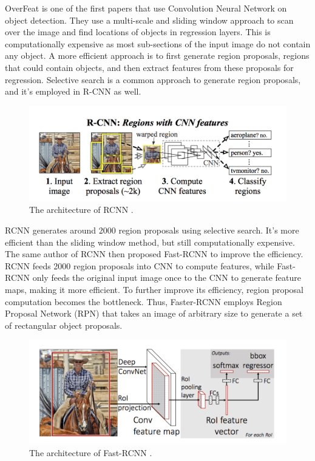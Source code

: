 OverFeat \cite{overfeat2014} is one of the first papers that use Convolution Neural Network on object detection. They use a multi-scale and sliding window approach to scan over the image and find locations of objects in regression layers. This is computationally expensive as most sub-sections of the input image do not contain any object. A more efficient approach is to first generate region proposals, regions that could contain objects, and then extract features from these proposals for regression. Selective search \cite{uijlings2013selective} is a common approach to generate region proposals, and it's employed in R-CNN \cite{girshick2014rich} as well. 

\begin{figure}[H]
\centering
\includegraphics[scale=0.45]{figures/chapter_detection/rcnn.png}
\caption{The architecture of RCNN \cite{girshick2014rich}.}
\label{fig.rcnn}
\end{figure}

RCNN generates around 2000 region proposals using selective search. It's more efficient than the sliding window method, but still computationally expensive. The same author of RCNN then proposed Fast-RCNN \cite{girshick2015fast} to improve the efficiency. RCNN feeds 2000 region proposals into CNN to compute features, while Fast-RCNN only feeds the original input image once to the CNN to generate feature maps, making it more efficient. To further improve its efficiency, region proposal computation becomes the bottleneck. Thus, Faster-RCNN \cite{ren2015faster} employs Region Proposal Network (RPN) that takes an image of arbitrary size to generate a set of rectangular object proposals.

\begin{figure}[H]
\centering
\includegraphics[scale=0.4]{figures/chapter_detection/fast-rcnn.png}
\caption{The architecture of Fast-RCNN \cite{girshick2015fast}.}
\label{fig.fastrcnn}
\end{figure}

